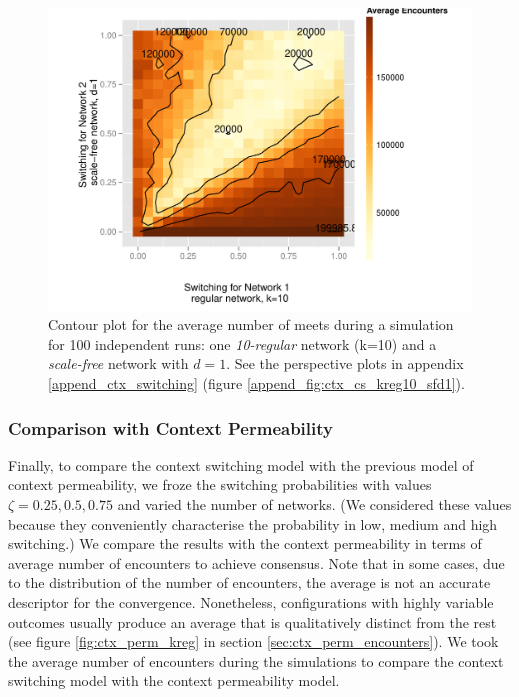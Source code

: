 \documentclass[preprint,number]{elsarticle}
\begin{document}
      \begin{figure}[H]
        \centering
	\includegraphics[width=1\linewidth]{"../analysis/pdf/context_switching_1_10regular_1_scale-free_d1_switching_contour"}
	\begin{minipage}{0.9\textwidth}
          \caption{Contour plot for the average number of meets during a simulation for 100
            independent runs: one \textit{10-regular} network (k=10) and a \textit{scale-free}
            network with $d=1$. See the perspective plots in appendix \ref{append_ctx_switching}
            (figure \ref{append_fig:ctx_cs_kreg10_sfd1}).  }
          \label{fig:ctx_cs_kreg10_sfd1}
	\end{minipage}
      \end{figure}


      \subsubsection{Comparison with Context Permeability}
      \noindent Finally, to compare the context switching model with the previous model of context
      permeability, we froze the switching probabilities with values $\zeta={0.25,0.5,0.75}$ and
      varied the number of networks. (We considered these values because they conveniently
      characterise the probability in low, medium and high switching.) We compare the results with
      the context permeability in terms of average number of encounters to achieve consensus. Note
      that in some cases, due to the distribution of the number of encounters, the average is not an
      accurate descriptor for the convergence. Nonetheless, configurations with highly variable
      outcomes usually produce an average that is qualitatively distinct from the rest (see figure
      \ref{fig:ctx_perm_kreg} in section \ref{sec:ctx_perm_encounters}). We took the average number
      of encounters during the simulations to compare the context switching model with the context
      permeability model.
\end{document}
